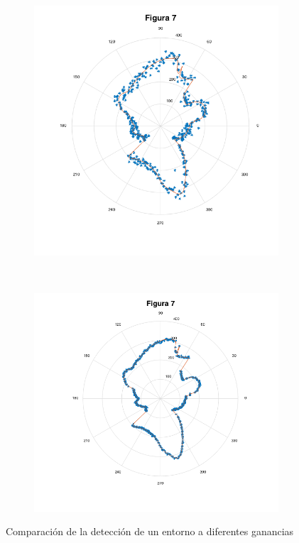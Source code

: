 \documentclass[letterpaper,11pt]{article}
\begin{document}
\begin{figure}[H]
    \centering
    \begin{subfigure}[b]{0.40\textwidth}
        \includegraphics[width=\textwidth]{img/parte_b/figura7.png}
    \end{subfigure}
    ~ %
    \begin{subfigure}[b]{0.45\textwidth}
        \includegraphics[width=\textwidth]{img/parte_c/figura72.png}
    \end{subfigure}
    
    \caption{Comparación de la detección de un entorno a diferentes ganancias}
    \label{partec3}
\end{figure}
\end{document}

